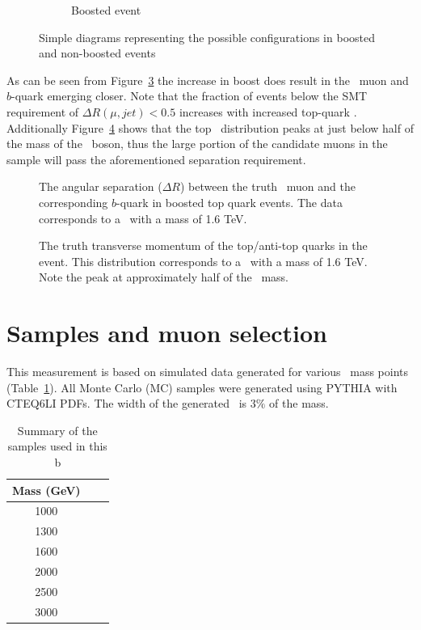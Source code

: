 \begin{figure}
\begin{subfigure}[b]{0.45\textwidth}
    \caption{Boosted event} \label{fig:BoostedDiagram}
  \end{subfigure}
  \caption{Simple diagrams representing the possible configurations in boosted and non-boosted events} \label{fig:SimpleAngularDiagrams}
\end{figure}

As can be seen from Figure~\ref{fig:ExampleCollimation} the increase in boost does result in the \W\ muon and $b$-quark emerging closer. Note that the fraction of events below the SMT requirement of $\Delta R(\mu,jet)<0.5$ increases with increased top-quark \pt. Additionally Figure~\ref{fig:ExampleBoost} shows that the top \pt\ distribution peaks at just below half of the mass of the \Zprime\ boson, thus the large portion of the candidate muons in the sample will pass the aforementioned separation requirement.

\begin{figure}
\caption{The angular separation ($\Delta R$) between the truth \W\ muon and the corresponding $b$-quark in boosted top quark events. The data corresponds to a \Zprime\ with a mass of 1.6 TeV.} \label{fig:ExampleCollimation}
\end{figure}

\begin{figure}
\caption{The truth transverse momentum of the top/anti-top quarks in the event. This distribution corresponds to a \Zprime\ with a mass of 1.6 TeV. Note the peak at approximately half of the \Zprime\ mass.} \label{fig:ExampleBoost}
\end{figure}

\section{Samples and muon selection}

This measurement is based on simulated data generated for various \Zprime\ mass points (Table~\ref{tab:BoostedSamples}). All Monte Carlo (MC) samples were generated using \textsc{PYTHIA} with CTEQ6LI PDFs. The width of the generated \Zprime\ is $3\%$ of the mass.

\begin{table}
  \centering
  \caption{Summary of the samples used in this b} \label{tab:BoostedSamples}
  \begin{tabular}{|c|c|c|}
  \hline
  Mass (GeV) \\ \hline
  1000 \\
  1300 \\
  1600 \\
  2000 \\
  2500 \\
  3000 \\
  \hline
  \end{tabular}
\end{table}

